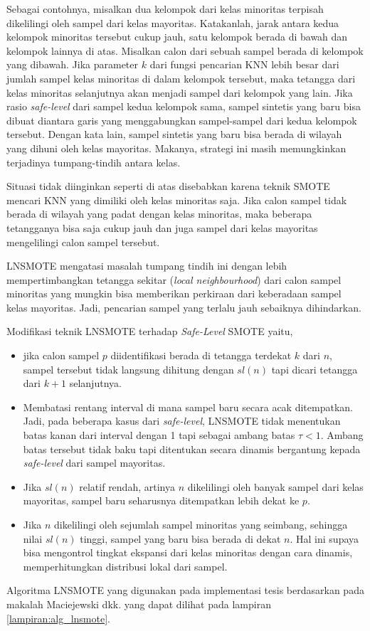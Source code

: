Sebagai contohnya, misalkan dua kelompok dari kelas minoritas terpisah
dikelilingi oleh sampel dari kelas mayoritas.
Katakanlah, jarak antara kedua kelompok minoritas tersebut cukup jauh, satu
kelompok berada di bawah dan kelompok lainnya di atas.
Misalkan calon dari sebuah sampel berada di kelompok yang dibawah.
Jika parameter $ k $ dari fungsi pencarian KNN lebih besar dari jumlah sampel
kelas minoritas di dalam kelompok tersebut, maka tetangga dari kelas minoritas
selanjutnya akan menjadi sampel dari kelompok yang lain.
Jika rasio \textit{safe-level} dari sampel kedua kelompok sama, sampel sintetis
yang baru bisa dibuat diantara garis yang menggabungkan sampel-sampel dari
kedua kelompok tersebut.
Dengan kata lain, sampel sintetis yang baru bisa berada di wilayah yang dihuni
oleh kelas mayoritas.
Makanya, strategi ini masih memungkinkan terjadinya tumpang-tindih antara
kelas.

Situasi tidak diinginkan seperti di atas disebabkan karena teknik SMOTE mencari
KNN yang dimiliki oleh kelas minoritas saja.
Jika calon sampel tidak berada di wilayah yang padat dengan kelas minoritas,
maka beberapa tetangganya bisa saja cukup jauh dan juga sampel dari kelas
mayoritas mengelilingi calon sampel tersebut.

LNSMOTE mengatasi masalah tumpang tindih ini dengan lebih mempertimbangkan
tetangga sekitar
(\textit{local neighbourhood})
dari calon sampel minoritas yang mungkin bisa memberikan perkiraan dari
keberadaan sampel kelas mayoritas.
Jadi, pencarian sampel yang terlalu jauh sebaiknya dihindarkan.

Modifikasi teknik LNSMOTE terhadap \textit{Safe-Level} SMOTE yaitu,
\begin{itemize}
\item jika calon sampel $ p $ diidentifikasi berada di tetangga terdekat $ k
$ dari $ n $, sampel tersebut tidak langsung dihitung dengan $ sl(n) $ tapi
dicari tetangga dari $ k + 1 $ selanjutnya.
\item Membatasi rentang interval di mana sampel baru secara acak ditempatkan.
Jadi, pada beberapa kasus dari \textit{safe-level}, LNSMOTE tidak menentukan
batas kanan dari interval dengan 1 tapi sebagai ambang batas $\tau < 1$.
Ambang batas tersebut tidak baku tapi ditentukan secara dinamis bergantung
kepada \textit{safe-level} dari sampel mayoritas.
\item Jika $ sl(n) $ relatif rendah, artinya $ n $ dikelilingi oleh banyak
sampel dari kelas mayoritas, sampel baru seharusnya ditempatkan lebih dekat ke
$ p $.
\item Jika $ n $ dikelilingi oleh sejumlah sampel minoritas yang seimbang,
sehingga nilai $ sl(n) $ tinggi, sampel yang baru bisa berada di dekat $ n $.
Hal ini supaya bisa mengontrol tingkat ekspansi dari kelas minoritas dengan
cara dinamis, memperhitungkan distribusi lokal dari sampel.
\end{itemize}

Algoritma LNSMOTE yang digunakan pada implementasi tesis berdasarkan pada
makalah Maciejewski dkk.
\cite{maciejewski2011local}
yang dapat dilihat pada lampiran
\ref{lampiran:alg_lnsmote}.
